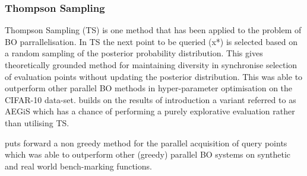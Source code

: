 		\subsubsection{Thompson Sampling}

			Thompson Sampling (TS) is one method that has been applied to the problem of BO parrallelisation\cite{26}\cite{27}. In TS the next point to be queried (x*) is selected based on a random sampling of the posterior probability distribution. This gives theoretically grounded method for maintaining diversity in synchronise selection of evaluation points without updating the posterior distribution. This was able to outperform other parallel BO methods in hyper-parameter optimisation on the CIFAR-10 data-set. 
			\cite{26} builds on the results of \cite{27} introduction a variant referred to as AEGiS which has a chance of performing a purely explorative evaluation rather than utilising TS.

			 \cite{36} puts forward a non greedy method for the parallel acquisition of query points which was able to outperform other (greedy) parallel BO systems on synthetic and real world bench-marking functions.
